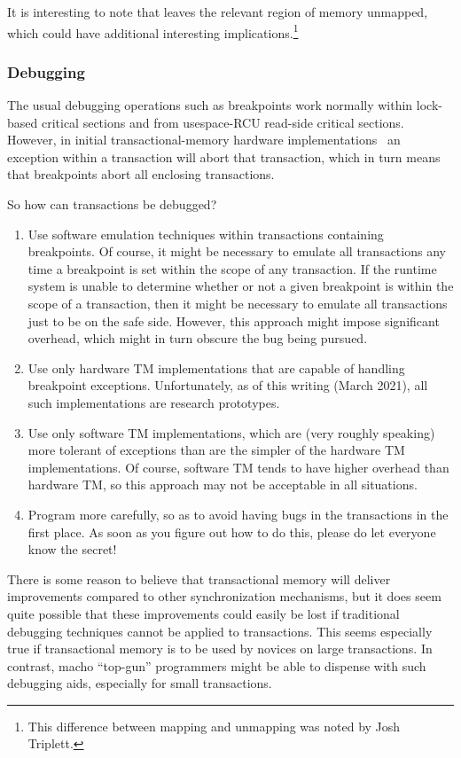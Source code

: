 It is interesting to note that  leaves the relevant region
of memory unmapped, which could have additional interesting
implications.\footnote{
	This difference between mapping and unmapping was noted by
	Josh Triplett.}

\subsubsection{Debugging}
\label{sec:future:Debugging}

The usual debugging operations such as breakpoints work normally within
lock-based critical sections and from usespace-RCU read-side critical sections.
However, in initial transactional-memory hardware
implementations~\cite{DaveDice2009ASPLOSRockHTM} an exception within
a transaction will abort that transaction, which in turn means that
breakpoints abort all enclosing transactions.

So how can transactions be debugged?

\begin{enumerate}
\item	Use software emulation techniques within transactions containing
	breakpoints.
	Of course, it might be necessary to emulate all transactions
	any time a breakpoint is set within the scope of any transaction.
	If the runtime system is unable to determine whether or not a
	given breakpoint is within the scope of a transaction, then it
	might be necessary to emulate all transactions just to be on
	the safe side.
	However, this approach might impose significant overhead, which
	might in turn obscure the bug being pursued.
\item	Use only hardware TM implementations that are capable of
	handling breakpoint exceptions.
	Unfortunately, as of this writing (March 2021), all such
	implementations are research prototypes.
\item	Use only software TM implementations, which are
	(very roughly speaking) more tolerant of exceptions than are
	the simpler of the hardware TM implementations.
	Of course, software TM tends to have higher overhead than hardware
	TM, so this approach may not be acceptable in all situations.
\item	Program more carefully, so as to avoid having bugs in the
	transactions in the first place.
	As soon as you figure out how to do this, please do let everyone
	know the secret!
\end{enumerate}

There is some reason to believe that transactional memory will deliver
 improvements compared to other synchronization mechanisms,
but it does seem quite possible that these improvements could easily
be lost if traditional debugging techniques cannot be applied to
transactions.
This seems especially true if transactional memory is to be used by
novices on large transactions.
In contrast, macho ``top-gun'' programmers might be able to dispense with
such debugging aids, especially for small transactions.

